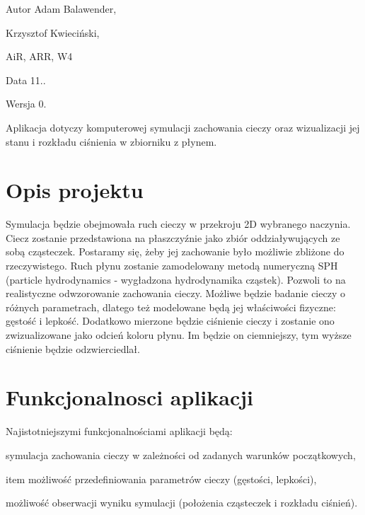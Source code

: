 \begin{DoxyAuthor}{Autor}
Adam Balawender, 

Krzysztof Kwieciński, 

Ai\-R, A\-R\-R, W4 
\end{DoxyAuthor}
\begin{DoxyDate}{Data}
11.. 
\end{DoxyDate}
\begin{DoxyVersion}{Wersja}
0.
\end{DoxyVersion}
Aplikacja dotyczy komputerowej symulacji zachowania cieczy oraz wizualizacji jej stanu i rozkładu ciśnienia w zbiorniku z płynem.\hypertarget{index_etykieta-opis-projektu}{}\section{Opis projektu}\label{index_etykieta-opis-projektu}
Symulacja będzie obejmowała ruch cieczy w przekroju 2\-D wybranego naczynia. Ciecz zostanie przedstawiona na płaszczyźnie jako zbiór oddziaływujących ze sobą cząsteczek. Postaramy się, żeby jej zachowanie było możliwie zbliżone do rzeczywistego. Ruch płynu zostanie zamodelowany metodą numeryczną S\-P\-H (particle hydrodynamics -\/ wygładzona hydrodynamika cząstek). Pozwoli to na realistyczne odwzorowanie zachowania cieczy. Możliwe będzie badanie cieczy o różnych parametrach, dlatego też modelowane będą jej właściwości fizyczne\-: gęstość i lepkość. Dodatkowo mierzone będzie ciśnienie cieczy i zostanie ono zwizualizowane jako odcień koloru płynu. Im będzie on ciemniejszy, tym wyższe ciśnienie będzie odzwierciedlał.\hypertarget{index_etykieta-funkcjonalnosci-aplikacji}{}\section{Funkcjonalnosci aplikacji}\label{index_etykieta-funkcjonalnosci-aplikacji}
Najistotniejszymi funkcjonalnościami aplikacji będą\-:
\begin{DoxyItemize}
\item symulacja zachowania cieczy w zależności od zadanych warunków początkowych,
\item item możliwość przedefiniowania parametrów cieczy (gęstości, lepkości),
\item możliwość obserwacji wyniku symulacji (położenia cząsteczek i rozkładu ciśnień). 
\end{DoxyItemize}